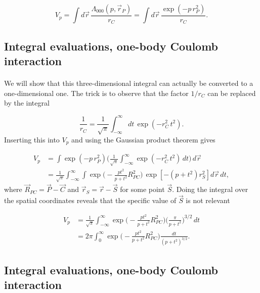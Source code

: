 \documentclass[%
twoside,                 %
final,                   %
10pt]{article}
\begin{document}
\begin{equation}
 V_p = \int d\vec r \, \frac{\Lambda_{000}(p,\vec r_P)}{r_C} = \int d\vec r\, \frac{\exp(-p\,r_P^2)}{r_C}.
\end{equation}



\subsection*{Integral evaluations, one-body Coulomb interaction}

\paragraph{}

We will show that this three-dimensional integral can actually be converted to a one-dimensional one. The trick is to observe that the factor $1/r_C$ can be replaced by the integral

\begin{equation}
 \frac{1}{r_C} = \frac{1}{\sqrt{\pi}}\int_{-\infty}^\infty dt\,\exp(-r^2_C\,t^2).
\end{equation}
Inserting this into $V_p$ and using the Gaussian product theorem gives

\begin{align}
 V_p & =  \int \exp(-p\,r_P^2)\Big(\frac{1}{\sqrt{\pi}}\int_{-\infty}^\infty\exp(-r^2_C\,t^2)\,dt\Big)\,d\vec r \\
     & =  \frac{1}{\sqrt{\pi}}\int_{-\infty}^\infty\int\exp\Big(-\frac{pt^2}{p + t^2}R^2_{PC}\Big)\,\exp[-(p + t^2)r^2_S] d\vec r\, dt,
\end{align}
where $\vec R_{PC} = \vec P - \vec C$ and $\vec r_S = \vec r - \vec S$ for some point $\vec S$. Doing the integral over the spatial coordinates reveals that the specific value of $\vec S$ is not relevant

\begin{align}
 V_p & =  \frac{1}{\sqrt{\pi}}\int_{-\infty}^\infty\exp\Big(-\frac{pt^2}{p + t^2}R^2_{PC}\Big)\Big(\frac{\pi}{p + t^2}\Big)^{3/2}\,dt \\
     & =  2\pi\int_0^\infty\exp\Big(-\frac{pt^2}{p + t^2}R^2_{PC}\Big)\frac{dt}{(p + t^2)^{3/2}}.
\end{align}



\subsection*{Integral evaluations, one-body Coulomb interaction}
\end{document}
